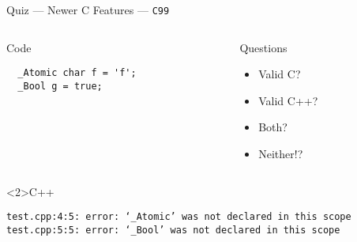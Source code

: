 \documentclass[presentation,aspectratio=169]{beamer}
\begin{document}
\begin{frame}[fragile,label={sec:org23c4234}]{Quiz — Newer C Features — \texttt{C99}}
 \begin{columns}
\begin{column}{0.48\columnwidth}
\begin{block}{Code}
\begin{verbatim}
  _Atomic char f = 'f';
  _Bool g = true;
\end{verbatim}
\end{block}
\end{column}

\begin{column}{0.48\columnwidth}
\begin{block}{Questions}
\begin{itemize}
\item Valid C?
\item Valid C++?
\item Both?
\item Neither!?
\end{itemize}
\end{block}
\end{column}
\end{columns}

\begin{block}<2>{C++}
\begin{verbatim}
test.cpp:4:5: error: ‘_Atomic’ was not declared in this scope
test.cpp:5:5: error: ‘_Bool’ was not declared in this scope
\end{verbatim}
\end{block}
\end{frame}

\end{document}
